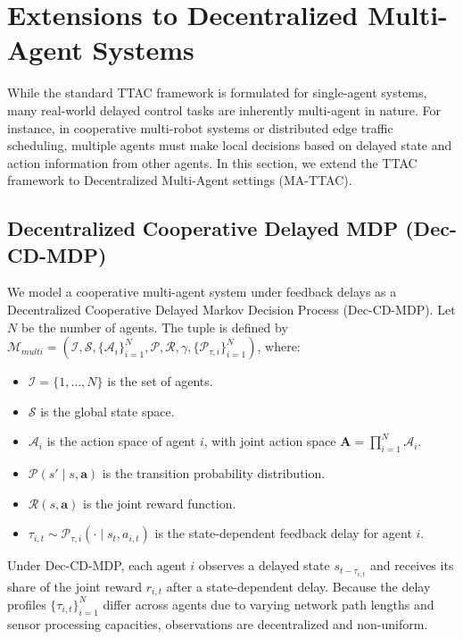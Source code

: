 \documentclass[manuscript, screen, review]{jair}
\begin{document}
\section{Extensions to Decentralized Multi-Agent Systems}\label{sec:extensions}
While the standard TTAC framework is formulated for single-agent systems, many real-world delayed control tasks are inherently multi-agent in nature. For instance, in cooperative multi-robot systems or distributed edge traffic scheduling, multiple agents must make local decisions based on delayed state and action information from other agents. In this section, we extend the TTAC framework to Decentralized Multi-Agent settings (MA-TTAC).

\subsection{Decentralized Cooperative Delayed MDP (Dec-CD-MDP)}
We model a cooperative multi-agent system under feedback delays as a Decentralized Cooperative Delayed Markov Decision Process (Dec-CD-MDP). Let $N$ be the number of agents. The tuple is defined by $\mathcal{M}_{multi} = (\mathcal{I}, \mathcal{S}, \{\mathcal{A}_i\}_{i=1}^N, \mathcal{P}, \mathcal{R}, \gamma, \{\mathcal{P}_{\tau, i}\}_{i=1}^N)$, where:
\begin{itemize}
    \item $\mathcal{I} = \{1, \dots, N\}$ is the set of agents.
    \item $\mathcal{S}$ is the global state space.
    \item $\mathcal{A}_i$ is the action space of agent $i$, with joint action space $\mathbf{A} = \prod_{i=1}^N \mathcal{A}_i$.
    \item $\mathcal{P}(s' \mid s, \mathbf{a})$ is the transition probability distribution.
    \item $\mathcal{R}(s, \mathbf{a})$ is the joint reward function.
    \item $\tau_{i, t} \sim \mathcal{P}_{\tau, i}(\cdot \mid s_t, a_{i, t})$ is the state-dependent feedback delay for agent $i$.
\end{itemize}
Under Dec-CD-MDP, each agent $i$ observes a delayed state $s_{t-\tau_{i, t}}$ and receives its share of the joint reward $r_{i, t}$ after a state-dependent delay. Because the delay profiles $\{\tau_{i, t}\}_{i=1}^N$ differ across agents due to varying network path lengths and sensor processing capacities, observations are decentralized and non-uniform.
\end{document}
